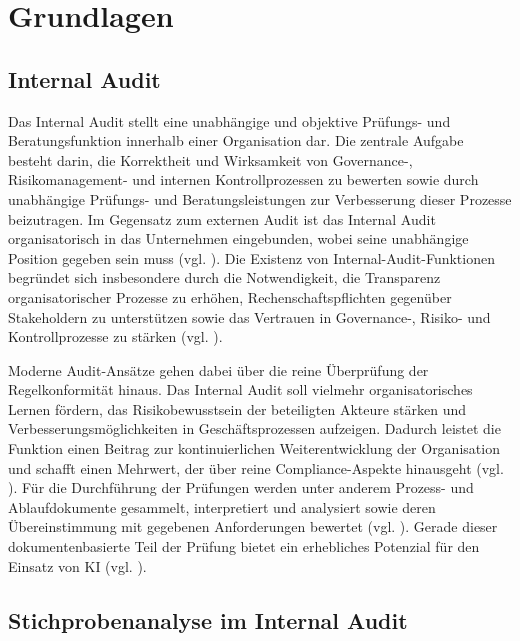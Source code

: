 \chapter{Grundlagen}

\section{Internal Audit}

Das Internal Audit stellt eine unabhängige und objektive Prüfungs- und Beratungsfunktion innerhalb einer Organisation dar. Die zentrale Aufgabe besteht darin, die Korrektheit und Wirksamkeit von Governance-, Risikomanagement- und internen Kontrollprozessen zu bewerten sowie durch unabhängige Prüfungs- und Beratungsleistungen zur Verbesserung dieser Prozesse beizutragen. Im Gegensatz zum externen Audit ist das Internal Audit organisatorisch in das Unternehmen eingebunden, wobei seine unabhängige Position gegeben sein muss (vgl. \cite[S.~12~ff., 46]{IIA2024}).
Die Existenz von Internal-Audit-Funktionen begründet sich insbesondere durch die Notwendigkeit, die Transparenz organisatorischer Prozesse zu erhöhen, Rechenschaftspflichten gegenüber Stakeholdern zu unterstützen sowie das Vertrauen in Governance-, Risiko- und Kontrollprozesse zu stärken (vgl. \cite[S.~1]{IIA_BoardRole2023}).

Moderne Audit-Ansätze gehen dabei über die reine Überprüfung der Regelkonformität hinaus. Das Internal Audit soll vielmehr organisatorisches Lernen fördern, das Risikobewusstsein der beteiligten Akteure stärken und Verbesserungsmöglichkeiten in Geschäftsprozessen aufzeigen. Dadurch leistet die Funktion einen Beitrag zur kontinuierlichen Weiterentwicklung der Organisation und schafft einen Mehrwert, der über reine Compliance-Aspekte hinausgeht (vgl. \cite[S.~18--21]{cantu2025making}). Für die Durchführung der Prüfungen werden unter anderem Prozess- und Ablaufdokumente gesammelt, interpretiert und analysiert sowie deren Übereinstimmung mit gegebenen Anforderungen bewertet (vgl. \cite[S.~556--557]{ROUSSY2013550}). Gerade dieser dokumentenbasierte Teil der Prüfung bietet ein erhebliches Potenzial für den Einsatz von \ac{KI} (vgl. \cite[S.~1]{schumann2021natural}).

\section{Stichprobenanalyse im Internal Audit}

